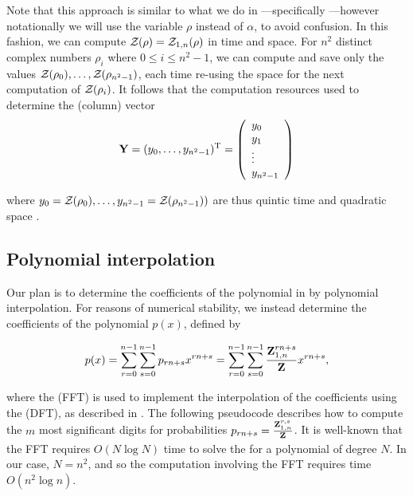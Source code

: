 Note that this approach is similar to what we do in \fftbor---specifically
---however notationally we will use the
variable $\rho$ instead of $\alpha$, to avoid confusion. In this fashion, we
can compute ${\mathcal Z}_{}(\rho)={\mathcal Z}_{1,n}(\rho)$ in
 time and  space. For $n^2$ distinct complex numbers
$\rho_i$ where $0 \leq i \leq n^2-1$, we can compute and save only the
values ${\mathcal Z}_{}(\rho_0),\dots,{\mathcal Z}_{}(\rho_{n^2-1})$, each time re-using the
 space for the next computation of ${\mathcal Z}_{}(\rho_i)$.
It follows that
the computation resources used to determine the (column) vector
\begin{align}
\label{eq:ffttwo:yColumn}
\bfY = (y_0,\dots,y_{n^2-1})^{\text T} =
\left(
\begin{array}{l}
y_0 \\
y_1 \\
\vdots \\
y_{n^2-1} \\
\end{array}
\right)
\end{align}

where $y_0={\mathcal Z}_{}(\rho_0),\dots,y_{n^2-1}={\mathcal Z}_{}(\rho_{n^2-1}))$ are thus
quintic time  and quadratic space .

\subsection{Polynomial interpolation}
Our plan is to determine the coefficients of the polynomial
\fullZx in  by
polynomial interpolation.  For reasons of numerical stability,
we instead determine the coefficients of the polynomial $p(x)$,
defined by

\begin{align}
\label{eq:ffttwo:pOfX}
p(x) =
\sum_{r=0}^{n-1} \sum_{s=0}^{n-1} p_{rn+s}
 x^{rn+s} =
\sum_{r=0}^{n-1} \sum_{s=0}^{n-1} \frac{\bfZ{rn+s}{1,n}}{\fullZ}
 x^{rn+s},
\end{align}

where the \fft (FFT) is used to implement the
interpolation of
the coefficients using the \idft (DFT), as
described in .  The following pseudocode
describes how
to compute the $m$ most significant digits
for probabilities
$p_{rn+s} = \frac{{\bf Z}^{r,s}_{1,n}}{{\bf Z}^{}_{}}$. It is well-known that
the FFT requires $O(N \log N)$ time to solve the \idft for a polynomial
of degree $N$. In our case,
$N=n^2$, and so the computation involving the FFT requires time $O(n^2 \log n)$.

